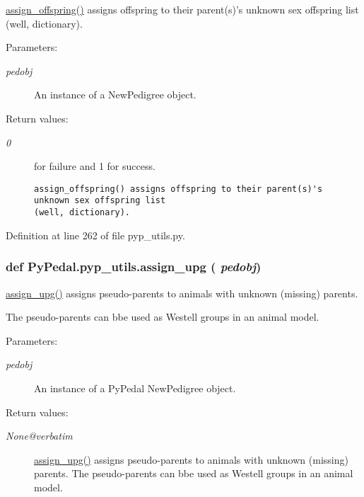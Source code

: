 \hyperlink{namespacePyPedal_1_1pyp__utils_c7e563808824c6680acff02146552cc4}{assign\_\-offspring()} assigns offspring to their parent(s)'s unknown sex offspring list (well, dictionary). 

\begin{Desc}
\item[Parameters:]
\begin{description}
\item[{\em pedobj}]An instance of a New\-Pedigree object. \end{description}
\end{Desc}
\begin{Desc}
\item[Return values:]
\begin{description}
\item[{\em 0}]for failure and 1 for success.

\footnotesize\begin{verbatim}assign_offspring() assigns offspring to their parent(s)'s unknown sex offspring list
(well, dictionary).
\end{verbatim}
\normalsize
 \end{description}
\end{Desc}


Definition at line 262 of file pyp\_\-utils.py.\hypertarget{namespacePyPedal_1_1pyp__utils_2d706d1ee358934a0576de030b9d56ac}{
\subsubsection[assign\_\-upg]{\setlength{\rightskip}{0pt plus 5cm}def Py\-Pedal.pyp\_\-utils.assign\_\-upg ( {\em pedobj})}}
\label{namespacePyPedal_1_1pyp__utils_2d706d1ee358934a0576de030b9d56ac}


\hyperlink{namespacePyPedal_1_1pyp__utils_2d706d1ee358934a0576de030b9d56ac}{assign\_\-upg()} assigns pseudo-parents to animals with unknown (missing) parents. 

The pseudo-parents can bbe used as Westell groups in an animal model. \begin{Desc}
\item[Parameters:]
\begin{description}
\item[{\em pedobj}]An instance of a Py\-Pedal New\-Pedigree object. \end{description}
\end{Desc}
\begin{Desc}
\item[Return values:]
\begin{description}
\item[{\em None@verbatim}]\hyperlink{namespacePyPedal_1_1pyp__utils_2d706d1ee358934a0576de030b9d56ac}{assign\_\-upg()} assigns pseudo-parents to animals with unknown (missing) parents. The pseudo-parents can bbe used as Westell groups in an animal model.  \end{description}
\end{Desc}


